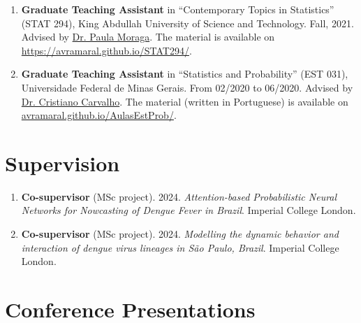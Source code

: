 \documentclass[10pt, ]{article}
\begin{document}
\begin{enumerate}[noitemsep, topsep=0pt]
		\item \textbf{Graduate Teaching Assistant} in ``Contemporary Topics in Statistics'' (STAT 294), King Abdullah University of Science and Technology. Fall, 2021. Advised by \href{https://www.paulamoraga.com/}{Dr. Paula Moraga}. The material is available on \href{https://avramaral.github.io/STAT294/}{\url{https://avramaral.github.io/STAT294/}}.
		
		\item \textbf{Graduate Teaching Assistant} in ``Statistics and Probability'' (EST 031), Universidade Federal de Minas Gerais. From 02/2020 to 06/2020. Advised by \href{http://www.est.ufmg.br/~cristianocs/}{Dr. Cristiano Carvalho}. The material (written in Portuguese) is available on \href{https://avramaral.github.io/AulasEstProb/}{\url{avramaral.github.io/AulasEstProb/}}.
	\end{enumerate}
	
	\vspace{10pt}
	
	\vspace{-12pt}
	\section*{Supervision} \vspace{-5pt}
	
	\begin{enumerate}[noitemsep, topsep=0pt]
		\item \textbf{Co-supervisor}  (MSc project). 2024.  \textit{Attention-based Probabilistic Neural Networks for Nowcasting of Dengue Fever in Brazil}. Imperial College London.
	\item \textbf{Co-supervisor}  (MSc project). 2024.  \textit{Modelling the dynamic behavior and interaction of dengue virus lineages in São Paulo, Brazil}. Imperial College London.
	\end{enumerate}
	
	\vspace{10pt}
	
	\vspace{-12pt}
	\section*{Conference Presentations} \vspace{-5pt}
	
\end{document}
